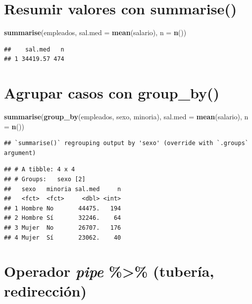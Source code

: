 \documentclass[
]{book}
\newenvironment{Shaded}{\begin{snugshade}}{\end{snugshade}}
\newcommand{\DataTypeTok}[1]{\textcolor[rgb]{0.13,0.29,0.53}{#1}}
\newcommand{\KeywordTok}[1]{\textcolor[rgb]{0.13,0.29,0.53}{\textbf{#1}}}
\newcommand{\NormalTok}[1]{#1}
\begin{document}
\hypertarget{resumir-valores-con-summarise}{%
\section{\texorpdfstring{Resumir valores con \textbf{summarise()}}{Resumir valores con summarise()}}\label{resumir-valores-con-summarise}}

\begin{Shaded}
\begin{Highlighting}[]
\KeywordTok{summarise}\NormalTok{(empleados, }\DataTypeTok{sal.med =} \KeywordTok{mean}\NormalTok{(salario), }\DataTypeTok{n =} \KeywordTok{n}\NormalTok{())}
\end{Highlighting}
\end{Shaded}

\begin{verbatim}
##    sal.med   n
## 1 34419.57 474
\end{verbatim}

\hypertarget{agrupar-casos-con-group_by}{%
\section{\texorpdfstring{Agrupar casos con \textbf{group\_by()}}{Agrupar casos con group\_by()}}\label{agrupar-casos-con-group_by}}

\begin{Shaded}
\begin{Highlighting}[]
\KeywordTok{summarise}\NormalTok{(}\KeywordTok{group_by}\NormalTok{(empleados, sexo, minoria), }\DataTypeTok{sal.med =} \KeywordTok{mean}\NormalTok{(salario), }\DataTypeTok{n =} \KeywordTok{n}\NormalTok{())}
\end{Highlighting}
\end{Shaded}

\begin{verbatim}
## `summarise()` regrouping output by 'sexo' (override with `.groups` argument)
\end{verbatim}

\begin{verbatim}
## # A tibble: 4 x 4
## # Groups:   sexo [2]
##   sexo   minoria sal.med     n
##   <fct>  <fct>     <dbl> <int>
## 1 Hombre No       44475.   194
## 2 Hombre Sí       32246.    64
## 3 Mujer  No       26707.   176
## 4 Mujer  Sí       23062.    40
\end{verbatim}

\hypertarget{operador-pipe-tuberuxeda-redirecciuxf3n}{%
\section{\texorpdfstring{Operador \emph{pipe} \textbf{\%\textgreater\%} (tubería, redirección)}{Operador pipe \%\textgreater\% (tubería, redirección)}}\label{operador-pipe-tuberuxeda-redirecciuxf3n}}
\end{document}
